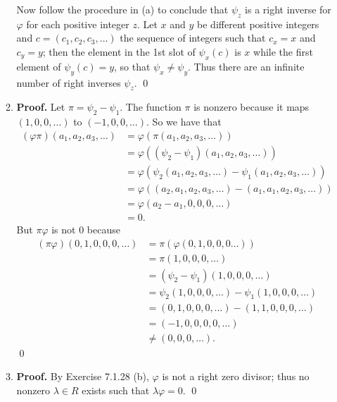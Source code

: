 \begin{enumerate}
\begin{enumerate}
               Now follow the procedure in (a) to conclude that $\psi_z$ is a 
               right inverse for $\varphi$ for each positive integer $z$. Let
               $x$ and $y$ be different positive integers and
               $c = (c_1, c_2, c_3, \ldots)$ the sequence of 
               integers such that $c_x = x$ and $c_y = y$; then the element in
               the 1st slot of $\psi_x(c)$ is $x$ while the first element of
               $\psi_y(c) = y$, so that $\psi_x \neq \psi_y$. Thus there are an
               infinite number of right inverses $\psi_z$. \qed
         \item \textbf{Proof.} Let $\pi = \psi_2 - \psi_1$. The function $\pi$ 
               is nonzero because it maps $(1, 0, 0, \ldots)$ to
               $(-1, 0, 0, \ldots)$. So we have that
               \begin{align*}
                  (\varphi\pi)(a_1, a_2, a_3, \ldots) &=
                     \varphi(\pi(a_1, a_2, a_3, \ldots)) \\
                     &= \varphi((\psi_2 - \psi_1)(a_1, a_2, a_3, \ldots)) \\
                     &= \varphi(\psi_2(a_1, a_2, a_3, \ldots) -
                        \psi_1(a_1, a_2, a_3, \ldots)) \\
                     &= \varphi((a_2, a_1, a_2, a_3, \ldots) -
                           (a_1, a_1, a_2, a_3, \ldots)) \\
                     &= \varphi(a_2-a_1, 0, 0, 0, \ldots) \\
                     &= 0.
               \end{align*}
               But $\pi\varphi$ is not 0 because
               \begin{align*}
                  (\pi\varphi)(0, 1, 0, 0, 0, \ldots) &=
                     \pi(\varphi(0, 1, 0, 0, 0 \ldots)) \\
                     &= \pi(1, 0, 0, 0, \ldots) \\
                     &= (\psi_2 - \psi_1)(1, 0, 0, 0, \ldots) \\
                     &= \psi_2(1, 0, 0, 0, \ldots)-\psi_1(1, 0, 0, 0, \ldots) \\
                     &= (0, 1, 0, 0, 0, \ldots) - (1, 1, 0, 0, 0, \ldots) \\
                     &= (-1, 0, 0, 0, 0, \ldots) \\
                     &\neq (0, 0, 0, \ldots).
               \end{align*} \qed
         \item \textbf{Proof.} By Exercise 7.1.28 (b), $\varphi$ is not a right 
               zero divisor; thus no nonzero $\lambda \in R$ exists such that
               $\lambda\varphi = 0$. \qed
      \end{enumerate}
\end{enumerate}
